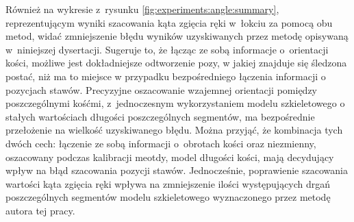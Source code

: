 Również na wykresie z~rysunku \ref{fig:experiments:angle:summary}, reprezentującym wyniki szacowania kąta zgięcia ręki w~łokciu za pomocą obu metod, widać zmniejszenie błędu wyników uzyskiwanych przez metodę opisywaną w~niniejszej dysertacji. Sugeruje to, że łącząc ze sobą informacje o~orientacji kości, możliwe jest dokładniejsze odtworzenie pozy, w jakiej znajduje się śledzona postać, niż ma to miejsce w przypadku bezpośredniego łączenia informacji o pozycjach stawów. Precyzyjne oszacowanie wzajemnej orientacji pomiędzy poszczególnymi kośćmi, z~jednoczesnym wykorzystaniem modelu szkieletowego o stałych wartościach długości poszczególnych segmentów, ma bezpośrednie przełożenie na wielkość uzyskiwanego błędu. Można przyjąć, że kombinacja tych dwóch cech: łączenie ze sobą informacji o~obrotach kości oraz niezmienny, oszacowany podczas kalibracji meotdy, model długości kości, mają decydujący wpływ na błąd szacowania pozycji stawów. Jednocześnie, poprawienie szacowania wartości kąta zgięcia ręki wpływa na zmniejszenie ilości występujących drgań poszczególnych segmentów modelu szkieletowego wyznaczonego przez metodę autora tej pracy.